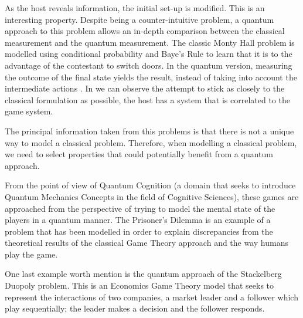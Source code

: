 As the host reveals information, the initial set-up is modified. This is an interesting property. Despite being a counter-intuitive problem, a quantum approach to this problem allows an in-depth comparison between the classical measurement and the quantum measurement. The classic Monty Hall problem is modelled using conditional probability and Baye's Rule to learn that it is to the advantage of the contestant to switch doors. In the quantum version, measuring the outcome of the final state yields the result, instead of taking into account the intermediate actions \cite{Fra2011}. In \cite{Gill2002} we can observe the attempt to stick as closely to the classical formulation as possible, the host has a system that is correlated to the game system.

The principal information taken from this problems is that there is not a unique way to model a classical problem\cite{Gill2002}. Therefore, when modelling a classical problem, we need to select properties that could potentially benefit from a quantum approach.

From the point of view of Quantum Cognition (a domain that seeks to introduce Quantum Mechanics Concepts in the field of Cognitive Sciences), these games are approached from the perspective of trying to model the mental state of the players in a quantum manner. The Prisoner's Dilemma is an example of a problem that has been modelled in order to explain discrepancies from the theoretical results of the classical Game Theory approach and the way humans play the game\cite{Pothos2009}. 

One last example worth mention is the quantum approach of the Stackelberg Duopoly problem\cite{Khan2011}\cite{Iqbal2008}. This is an Economics Game Theory model that seeks to represent the interactions of two companies, a market leader and a follower which play sequentially; the leader makes a decision and the follower responds. 


